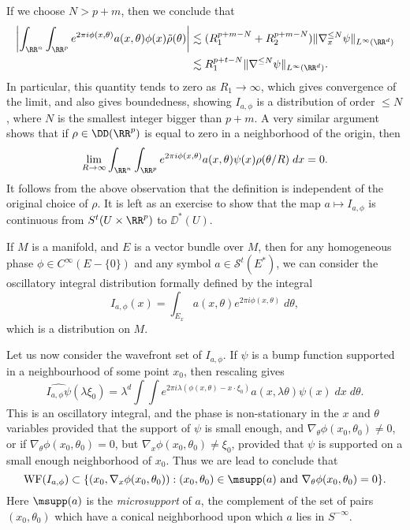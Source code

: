 %
If we choose $N > p + m$, then we conclude that
%
\begin{align*}
    \left| \int_{\RR^n} \int_{\RR^p} e^{2 \pi i \phi(x,\theta)} a(x,\theta) \phi(x) \tilde{\rho}(\theta) \right| &\lesssim (R_1^{p + m - N} + R_2^{p + m - N}) \| \nabla^{\leq N}_x \psi \|_{L^\infty(\RR^d)}\\
    &\lesssim R_1^{p + t - N} \| \nabla^{\leq N} \psi \|_{L^\infty(\RR^d)}.
\end{align*}
%
In particular, this quantity tends to zero as $R_1 \to \infty$, which gives convergence of the limit, and also gives boundedness, showing $I_{a,\phi}$ is a distribution of order $\leq N$, where $N$ is the smallest integer bigger than $p + m$. A very similar argument shows that if $\rho \in \DD(\RR^p)$ is equal to zero in a neighborhood of the origin, then
%
\[ \lim_{R \to \infty} \int_{\RR^n} \int_{\RR^p} e^{2 \pi i \phi(x,\theta)} a(x,\theta) \psi(x) \rho(\theta / R)\; dx = 0. \]
%
It follows from the above observation that the definition is independent of the original choice of $\rho$. It is left as an exercise to show that the map $a \mapsto I_{a,\phi}$ is continuous from $S^t(U \times \RR^p)$ to $\DD^*(U)$.

\begin{remark}
    If $M$ is a manifold, and $E$ is a vector bundle over $M$, then for any homogeneous phase $\phi \in C^\infty(E - \{ 0 \})$ and any symbol $a \in \mathcal{S}^t(E^*)$, we can consider the oscillatory integral distribution formally defined by the integral
    \[ I_{a,\phi}(x) = \int_{E_x} a(x,\theta) e^{2 \pi i \phi(x,\theta)}\; d\theta, \]
    which is a distribution on $M$.
\end{remark}

Let us now consider the wavefront set of $I_{a,\phi}$. If $\psi$ is a bump function supported in a neighbourhood of some point $x_0$, then rescaling gives
%
\[ \widehat{I_{a,\phi} \psi}(\lambda \xi_0) = \lambda^d \int \int e^{2 \pi i \lambda (\phi(x,\theta) - x \cdot \xi_0)} a(x,\lambda \theta) \psi(x)\; dx\; d\theta. \]
%
This is an oscillatory integral, and the phase is non-stationary in the $x$ and $\theta$ variables provided that the support of $\psi$ is small enough, and $\nabla_\theta \phi(x_0,\theta_0) \neq 0$, or if $\nabla_\theta \phi(x_0,\theta_0) = 0$, but $\nabla_x \phi(x_0,\theta_0) \neq \xi_0$, provided that $\psi$ is supported on a small enough neighborhood of $x_0$. Thus we are lead to conclude that
%
\[ \text{WF}(I_{a,\phi}) \subset \{ (x_0,\nabla_x \phi(x_0,\theta_0)): (x_0,\theta_0) \in \msupp(a)\ \text{and}\ \nabla_\theta \phi(x_0,\theta_0) = 0 \}. \]
%
Here $\msupp(a)$ is the \emph{microsupport} of $a$, the complement of the set of pairs $(x_0,\theta_0)$ which have a conical neighborhood upon which $a$ lies in $S^{-\infty}$.

